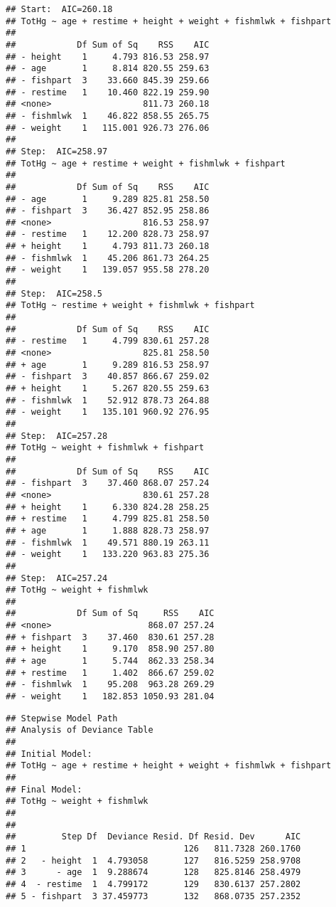 \documentclass[12pt,]{article}
\newenvironment{Shaded}{\begin{snugshade}}{\end{snugshade}}
\newcommand{\CommentTok}[1]{\textcolor[rgb]{0.56,0.35,0.01}{\textit{#1}}}
\newcommand{\OperatorTok}[1]{\textcolor[rgb]{0.81,0.36,0.00}{\textbf{#1}}}
\newcommand{\NormalTok}[1]{#1}
\begin{document}
\begin{verbatim}
## Start:  AIC=260.18
## TotHg ~ age + restime + height + weight + fishmlwk + fishpart
## 
##            Df Sum of Sq    RSS    AIC
## - height    1     4.793 816.53 258.97
## - age       1     8.814 820.55 259.63
## - fishpart  3    33.660 845.39 259.66
## - restime   1    10.460 822.19 259.90
## <none>                  811.73 260.18
## - fishmlwk  1    46.822 858.55 265.75
## - weight    1   115.001 926.73 276.06
## 
## Step:  AIC=258.97
## TotHg ~ age + restime + weight + fishmlwk + fishpart
## 
##            Df Sum of Sq    RSS    AIC
## - age       1     9.289 825.81 258.50
## - fishpart  3    36.427 852.95 258.86
## <none>                  816.53 258.97
## - restime   1    12.200 828.73 258.97
## + height    1     4.793 811.73 260.18
## - fishmlwk  1    45.206 861.73 264.25
## - weight    1   139.057 955.58 278.20
## 
## Step:  AIC=258.5
## TotHg ~ restime + weight + fishmlwk + fishpart
## 
##            Df Sum of Sq    RSS    AIC
## - restime   1     4.799 830.61 257.28
## <none>                  825.81 258.50
## + age       1     9.289 816.53 258.97
## - fishpart  3    40.857 866.67 259.02
## + height    1     5.267 820.55 259.63
## - fishmlwk  1    52.912 878.73 264.88
## - weight    1   135.101 960.92 276.95
## 
## Step:  AIC=257.28
## TotHg ~ weight + fishmlwk + fishpart
## 
##            Df Sum of Sq    RSS    AIC
## - fishpart  3    37.460 868.07 257.24
## <none>                  830.61 257.28
## + height    1     6.330 824.28 258.25
## + restime   1     4.799 825.81 258.50
## + age       1     1.888 828.73 258.97
## - fishmlwk  1    49.571 880.19 263.11
## - weight    1   133.220 963.83 275.36
## 
## Step:  AIC=257.24
## TotHg ~ weight + fishmlwk
## 
##            Df Sum of Sq     RSS    AIC
## <none>                   868.07 257.24
## + fishpart  3    37.460  830.61 257.28
## + height    1     9.170  858.90 257.80
## + age       1     5.744  862.33 258.34
## + restime   1     1.402  866.67 259.02
## - fishmlwk  1    95.208  963.28 269.29
## - weight    1   182.853 1050.93 281.04
\end{verbatim}

\begin{Shaded}
\end{Shaded}

\begin{verbatim}
## Stepwise Model Path 
## Analysis of Deviance Table
## 
## Initial Model:
## TotHg ~ age + restime + height + weight + fishmlwk + fishpart
## 
## Final Model:
## TotHg ~ weight + fishmlwk
## 
## 
##         Step Df  Deviance Resid. Df Resid. Dev      AIC
## 1                               126   811.7328 260.1760
## 2   - height  1  4.793058       127   816.5259 258.9708
## 3      - age  1  9.288674       128   825.8146 258.4979
## 4  - restime  1  4.799172       129   830.6137 257.2802
## 5 - fishpart  3 37.459773       132   868.0735 257.2352
\end{verbatim}
\end{document}
